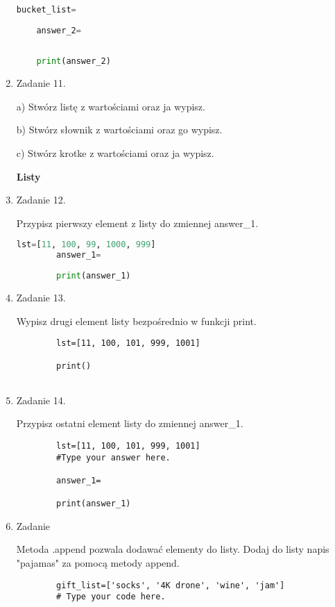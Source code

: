 \documentclass[11pt]{article}
\begin{document}
\begin{enumerate}
\begin{lstlisting}[language=Python]
	bucket_list=
	
	answer_2=
	
	
	print(answer_2)
\end{lstlisting}

	\item 
	\begin{Large}
		Zadanie 11.
	\end{Large}
	\par
	a) Stwórz listę z wartościami oraz ja wypisz.
	\par
	b) Stwórz słownik z wartościami oraz go wypisz.
	\par
	c) Stwórz krotke z wartościami oraz ja wypisz.
	
	\medskip
	\begin{Large}
		\textbf{Listy}
	\end{Large}
	\item 
	\begin{Large}
		Zadanie 12.
	\end{Large}
	\par
	Przypisz pierwszy element z listy do zmiennej answer\_1.
	\begin{lstlisting}[language=Python]
		lst=[11, 100, 99, 1000, 999]
		answer_1=
		
		print(answer_1)
	\end{lstlisting}
	
	\item 
	\begin{Large}
		Zadanie 13.
	\end{Large}
	\par
	Wypisz drugi element listy bezpośrednio w funkcji print.
	\begin{lstlisting}
		lst=[11, 100, 101, 999, 1001]
		
		print()
		
	\end{lstlisting}
	
	\item 
	\begin{Large}
		Zadanie 14.
	\end{Large}
	\par
	Przypisz ostatni element listy do zmiennej answer\_1.
	\begin{lstlisting}
		lst=[11, 100, 101, 999, 1001]
		#Type your answer here.
		
		answer_1=
		
		print(answer_1)
	\end{lstlisting}

	\item
	\begin{Large}
		Zadanie
	\end{Large}
	\par
	Metoda .append pozwala dodawać elementy do listy.
	Dodaj do listy napis "pajamas" za pomocą metody append. 
	\begin{lstlisting}
		gift_list=['socks', '4K drone', 'wine', 'jam']
		# Type your code here.
		

\end{lstlisting}
\end{enumerate}
\end{document}

